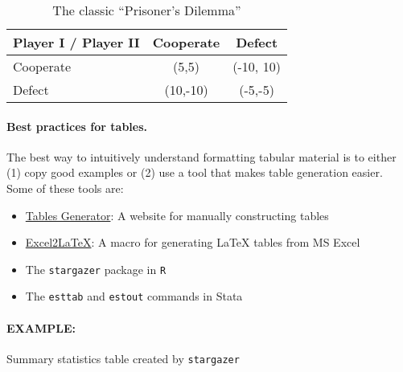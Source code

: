\documentclass[11pt]{article}
\begin{document}
\begin{table}[!htbp]
  \centering
  \caption{The classic ``Prisoner's Dilemma''}
    \begin{tabular}{|l|c|c|}
    \hline
    {\bf Player I / Player II} & Cooperate & Defect \\
    \hline
    Cooperate & (5,5) & (-10, 10) \\
    \hline
    Defect & (10,-10) & (-5,-5) \\
    \hline
    \end{tabular}
  \label{tab_prison}
\end{table}

\paragraph{Best practices for tables.} The best way to intuitively understand formatting tabular material is to either (1) copy good examples or (2) use a tool that makes table generation easier. Some of these tools are:

\begin{itemize}[nolistsep,noitemsep]
    \item \href{https://www.tablesgenerator.com/}{Tables Generator}: A website for manually constructing tables
    \item \href{https://ctan.org/pkg/excel2latex?lang=en}{Excel2LaTeX}: A macro for generating {\LaTeX} tables from MS Excel
    \item The \texttt{stargazer} package in \texttt{R}
    \item The \texttt{esttab} and \texttt{estout} commands in Stata
\end{itemize}

\paragraph{EXAMPLE:} Summary statistics table created by \texttt{stargazer}
\end{document}

